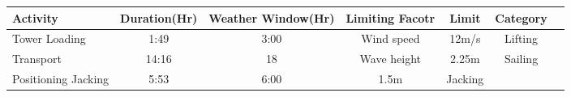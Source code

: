 \begin{table}
\label{tab:Sampleinputparameters}
\begin{tabular}{lcccccc}
\hline
Activity & Duration(Hr) & Weather Window(Hr)& Limiting Facotr & Limit & Category \\
\hline 
Tower Loading & 1:49 & 3:00 & Wind speed & 12m/s & Lifting \\
Transport  & 14:16 & 18 & Wave height & 2.25m & Sailing \\
Positioning  Jacking & 5:53 & 6:00 & 1.5m & Jacking \\
\hline
\end{tabular}
\end{table}




